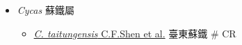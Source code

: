 
  \begin{itemize}
 \item[] \textit{Cycas} 蘇鐵屬
                            
  \begin{itemize}
        \item[] \href{http://www.theplantlist.org/tpl1.1/search?q=Cycas+taitungensis}{\textit{C. taitungensis} C.F.Shen et al.}   臺東蘇鐵  \# CR
  \end{itemize}
  \end{itemize}
